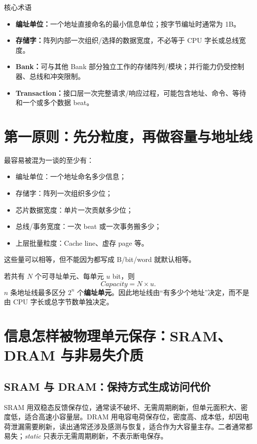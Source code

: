 \documentclass[UTF8,fontset=fandol,11pt,a4paper]{ctexart}
\newcommand{\kw}[1]{\textbf{\color{deep}#1}}\newcommand{\code}[1]{\texttt{#1}}
\begin{document}
\begin{methodbox}{核心术语}
\begin{itemize}
\item \kw{编址单位：}一个地址直接命名的最小信息单位；按字节编址时通常为 1B。
\item \kw{存储字：}阵列内部一次组织/选择的数据宽度，不必等于 CPU 字长或总线宽度。
\item \kw{Bank：}可与其他 Bank 部分独立工作的存储阵列/模块；并行能力仍受控制器、总线和冲突限制。
\item \kw{Transaction：}接口层一次完整请求/响应过程，可能包含地址、命令、等待和一个或多个数据 beat。
\end{itemize}
\end{methodbox}

\section{第一原则：先分粒度，再做容量与地址线}
最容易被混为一谈的至少有：
\begin{itemize}
\item 编址单位：一个地址命名多少信息；
\item 存储字：阵列一次组织多少位；
\item 芯片数据宽度：单片一次贡献多少位；
\item 总线/事务宽度：一次 beat 或一次事务搬多少；
\item 上层批量粒度：Cache line、虚存 page 等。
\end{itemize}
这些量可以相等，但不能因为都写成 B/bit/word 就默认相等。

若共有 $N$ 个可寻址单元、每单元 $u$ bit，则
\[
Capacity=N\times u.
\]
$n$ 条地址线最多区分 $2^n$ 个\textbf{编址单元}。因此地址线由“有多少个地址”决定，而不是由 CPU 字长或总字节数单独决定。

\section{信息怎样被物理单元保存：SRAM、DRAM 与非易失介质}
\subsection{SRAM 与 DRAM：保持方式生成访问代价}
SRAM 用双稳态反馈保存位，通常读不破坏、无需周期刷新，但单元面积大、密度低，适合高速小容量层。DRAM 用电容电荷保存位，密度高、成本低，却因电荷泄漏需要刷新，读出通常还涉及感测与恢复，适合作为大容量主存。二者通常都易失；\textit{static} 只表示无需周期刷新，不表示断电保存。
\end{document}

